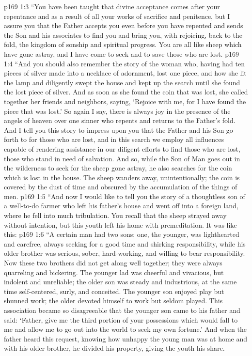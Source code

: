 \vs p169 1:3 \textcolor{ubdarkred}{“You have been taught that divine acceptance comes after your repentance and as a result of all your works of sacrifice and penitence, but I assure you that the Father accepts you even before you have repented and sends the Son and his associates to find you and bring you, with rejoicing, back to the fold, the kingdom of sonship and spiritual progress. You are all like sheep which have gone astray, and I have come to seek and to save those who are lost.}
\vs p169 1:4 \textcolor{ubdarkred}{“And you should also remember the story of the woman who, having had ten pieces of silver made into a necklace of adornment, lost one piece, and how she lit the lamp and diligently swept the house and kept up the search until she found the lost piece of silver. And as soon as she found the coin that was lost, she called together her friends and neighbors, saying, ‘Rejoice with me, for I have found the piece that was lost.’ So again I say, there is always joy in the presence of the angels of heaven over one sinner who repents and returns to the Father’s fold. And I tell you this story to impress upon you that the Father and his Son go forth to  for those who are lost, and in this search we employ all influences capable of rendering assistance in our diligent efforts to find those who are lost, those who stand in need of salvation. And so, while the Son of Man goes out in the wilderness to seek for the sheep gone astray, he also searches for the coin which is lost in the house. The sheep wanders away, unintentionally; the coin is covered by the dust of time and obscured by the accumulation of the things of men.}
\vs p169 1:5 \textcolor{ubdarkred}{“And now I would like to tell you the story of a thoughtless son of a well\hyp{}to\hyp{}do farmer who  left his father’s house and went off into a foreign land, where he fell into much tribulation. You recall that the sheep strayed away without intention, but this youth left his home with premeditation. It was like this:}
\pc \vs p169 1:6 \textcolor{ubdarkred}{“A certain man had two sons; one, the younger, was lighthearted and carefree, always seeking for a good time and shirking responsibility, while his older brother was serious, sober, hard\hyp{}working, and willing to bear responsibility. Now these two brothers did not get along well together; they were always quarreling and bickering. The younger lad was cheerful and vivacious, but indolent and unreliable; the older son was steady and industrious, at the same time self\hyp{}centered, surly, and conceited. The younger son enjoyed play but shunned work; the older devoted himself to work but seldom played. This association became so disagreeable that the younger son came to his father and said: ‘Father, give me the third portion of your possessions which would fall to me and allow me to go out into the world to seek my own fortune.’ And when the father heard this request, knowing how unhappy the young man was at home and with his older brother, he divided his property, giving the youth his share.}
